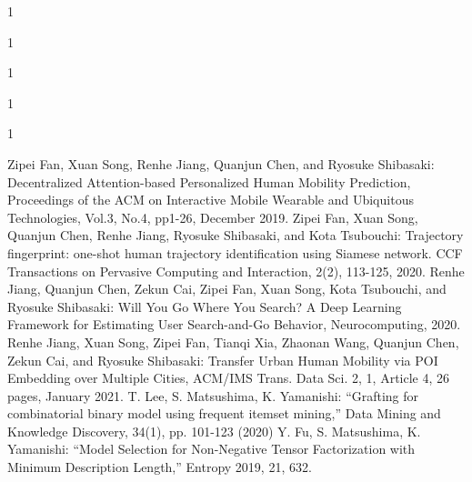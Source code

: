 \begin{招待講演}{1}

\end{招待講演}

\begin{招待論文}{1}

\end{招待論文}

\begin{受賞}{1}

\end{受賞}

\begin{著書}{1}

\end{著書}

\begin{雑誌論文}{1}

Zipei Fan, Xuan Song, Renhe Jiang, Quanjun Chen, and Ryosuke Shibasaki:
Decentralized Attention-based Personalized Human Mobility Prediction, Proceedings of the ACM on Interactive Mobile Wearable and Ubiquitous Technologies, Vol.3, No.4, pp1-26, December 2019.
Zipei Fan, Xuan Song, Quanjun Chen, Renhe Jiang, Ryosuke Shibasaki, and Kota Tsubouchi:  
Trajectory fingerprint: one-shot human trajectory identification using Siamese network. CCF Transactions on Pervasive Computing and Interaction, 2(2), 113-125, 2020.
Renhe Jiang, Quanjun Chen, Zekun Cai, Zipei Fan, Xuan Song, Kota Tsubouchi, and Ryosuke Shibasaki: 
Will You Go Where You Search? A Deep Learning Framework for Estimating User Search-and-Go Behavior, Neurocomputing, 2020.
Renhe Jiang, Xuan Song, Zipei Fan, Tianqi Xia, Zhaonan Wang, Quanjun Chen, Zekun Cai, and Ryosuke Shibasaki: 
Transfer Urban Human Mobility via POI Embedding over Multiple Cities, ACM/IMS Trans. Data Sci. 2, 1, Article 4, 26 pages, January 2021.
T. Lee, S. Matsushima, K. Yamanishi: “Grafting for combinatorial binary model using frequent itemset mining,” Data Mining and Knowledge Discovery, 34(1), pp. 101-123 (2020)
Y. Fu, S. Matsushima, K. Yamanishi: “Model Selection for Non-Negative Tensor Factorization with Minimum Description Length,” Entropy 2019, 21, 632.
\end{雑誌論文}


